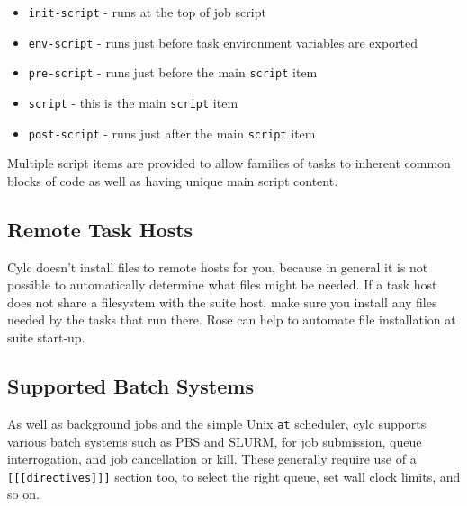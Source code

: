 \begin{itemize}
    \item \lstinline=init-script= - runs at the top of job script
    \item \lstinline=env-script= - runs just before task environment variables are exported
    \item \lstinline=pre-script= - runs just before the main \lstinline=script= item
    \item \lstinline=script= - this is the main \lstinline=script= item
    \item \lstinline=post-script= - runs just after the main \lstinline=script= item
\end{itemize}

Multiple script items are provided to allow families of tasks to inherent common
blocks of code as well as having unique main script content.

\subsection{Remote Task Hosts}

Cylc doesn't install files to remote hosts for you, because in general it is
not possible to automatically determine what files might be needed.  If a task
host does not share a filesystem with the suite host, make sure you install any
files needed by the tasks that run there.  Rose can help to automate file
installation at suite start-up.

\subsection{Supported Batch Systems}

As well as background jobs and the simple Unix \lstinline=at= scheduler, cylc
supports various batch systems such as PBS and SLURM, for job submission,
queue interrogation, and job cancellation or kill. These generally require use
of a \lstinline=[[[directives]]]= section too, to select the right queue, set
wall clock limits, and so on.


